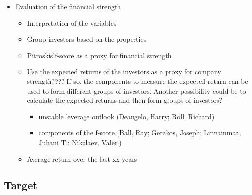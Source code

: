 \documentclass[12pt]{article}
\begin{document}
\begin{itemize}
        \item Evaluation of the financial strength
    
            \begin{itemize}
            \item Interpretation of the variables
            \item Group investors based on the properties
            \item Pitroskis'f-score as a proxy for financial strength
            \item Use the expected returns of the investors as a proxy for company strength???? If so, the components to measure the expected return can be used to form different groups of investors. Another possibility could be to calculate the expected returns and then form groups of investors? 

            \begin{itemize}
                \item unstable leverage outlook (Deangelo, Harry; Roll, Richard)
                \item components of the f-score (Ball, Ray; Gerakos, Joseph; Linnainmaa, Juhani T.; Nikolaev, Valeri)
                
                
            \end{itemize}
            \item Average return over the last xx years 
            \end{itemize}

    
    \end{itemize}

\subsection{Target}
\end{document}
